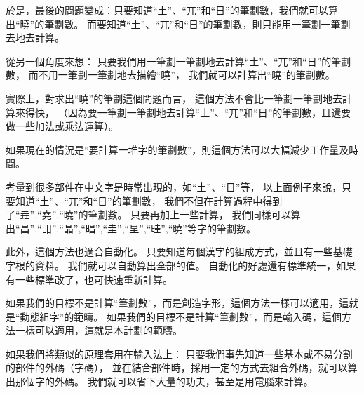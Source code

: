 \documentclass{article}
\begin{document}
於是，最後的問題變成：只要知道``土''、``兀''和``日''的筆劃數，我們就可以算出``曉''的筆劃數。
而要知道``土''、``兀''和``日''的筆劃數，則只能用一筆劃一筆劃去地去計算。

從另一個角度來想：
只要我們用一筆劃一筆劃地去計算``土''、``兀''和``日''的筆劃數，
而不用一筆劃一筆劃地去描繪``曉''，
我們就可以計算出``曉''的筆劃數。

實際上，對求出``曉''的筆劃這個問題而言，
這個方法不會比一筆劃一筆劃地去計算來得快，
（因為要一筆劃一筆劃地去計算``土''、``兀''和``日''的筆劃數，且還要做一些加法或乘法運算）。

如果現在的情況是``要計算一堆字的筆劃數''，則這個方法可以大幅減少工作量及時間。

考量到很多部件在中文字是時常出現的，如``土''、``日''等，
以上面例子來說，只要知道``土''、``兀''和``日''的筆劃數，
我們不但在計算過程中得到了``垚'',``堯'',``曉''的筆劃數。
只要再加上一些計算，
我們同樣可以算出``昌'',``昍'',``晶'',``晿'',``圭'',``圼'',``晆'',``曉''等字的筆劃數。


此外，這個方法也適合自動化。
只要知道每個漢字的組成方式，並且有一些基礎字根的資料。
我們就可以自動算出全部的值。
自動化的好處還有標準統一，如果有一些標準改了，也可快速重新計算。


如果我們的目標不是計算``筆劃數''，而是創造字形，這個方法一樣可以適用，這就是``動態組字''的範疇。
如果我們的目標不是計算``筆劃數''，而是輸入碼，這個方法一樣可以適用，這就是本計劃的範疇。

如果我們將類似的原理套用在輸入法上：
只要我們事先知道一些基本或不易分割的部件的外碼（字碼），
並在結合部件時，採用一定的方式去組合外碼，就可以算出那個字的外碼。
我們就可以省下大量的功夫，甚至是用電腦來計算。
\end{document}
